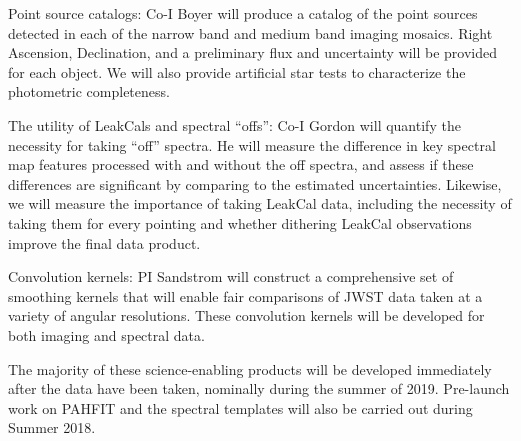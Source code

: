 \documentclass[12pt]{article}
\begin{document}
Point source catalogs: Co-I Boyer will produce a catalog of the point sources detected in each of the narrow band and medium band imaging mosaics.  Right Ascension, Declination, and a preliminary flux and uncertainty will be provided for each object. We will also provide artificial star tests to characterize the photometric completeness. 

The utility of LeakCals and spectral ``offs'': Co-I Gordon will quantify the necessity for taking ``off'' spectra.  He will measure the difference in key spectral map features processed with and without the off spectra, and assess if these differences are significant by comparing to the estimated uncertainties. Likewise, we will measure the importance of taking LeakCal data, including the necessity of taking them for every pointing and whether dithering LeakCal observations improve the final data product.

Convolution kernels: PI Sandstrom will construct a comprehensive set of smoothing kernels that will enable fair comparisons of JWST data taken at a variety of angular resolutions.  These convolution kernels will be developed for both imaging and spectral data.

The majority of these science-enabling products will be developed immediately after the data have been taken, nominally during the summer of 2019.  Pre-launch work on PAHFIT and the spectral templates will also be carried out during Summer 2018.

\end{document}
